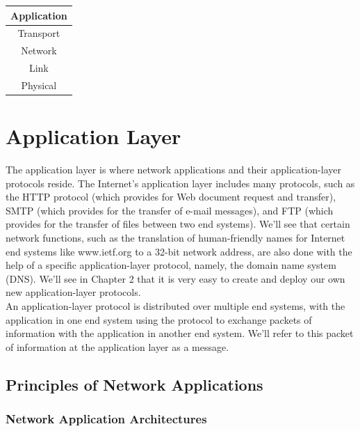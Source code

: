 \documentclass[12pt]{article}
\begin{document}
\begin{tabular}{ | c | }
    \hline Application \\
    \hline Transport \\
    \hline Network \\
    \hline Link \\
    \hline Physical \\ 
    \hline
\end{tabular}

\newpage

\section{Application Layer}

The application layer is where network applications and their application-layer protocols reside. The Internet's application layer includes many protocols, such as the HTTP protocol (which provides for Web document request and transfer), SMTP (which provides for the transfer of e-mail messages), and FTP (which provides for the transfer of files between two end systems). We'll see that certain network functions, such as the translation of human-friendly names for Internet end systems like www.ietf.org to a 32-bit network address, are also done with the help of a specific application-layer protocol, namely, the domain name system (DNS). We'll see in Chapter 2 that it is very easy to create and deploy our own new application-layer protocols.
\vspace{0.5cm} \\
An application-layer protocol is distributed over multiple end systems, with the application in one end system using the protocol to exchange packets of information with the application in another end system. We'll refer to this packet of information at the application layer as a message.

\subsection{Principles of Network Applications}

\subsubsection{Network Application Architectures}
\end{document}
